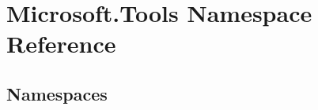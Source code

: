\hypertarget{namespace_microsoft_1_1_tools}{}\section{Microsoft.\+Tools Namespace Reference}
\label{namespace_microsoft_1_1_tools}
\subsection*{Namespaces}
\begin{DoxyCompactItemize}
\end{DoxyCompactItemize}
